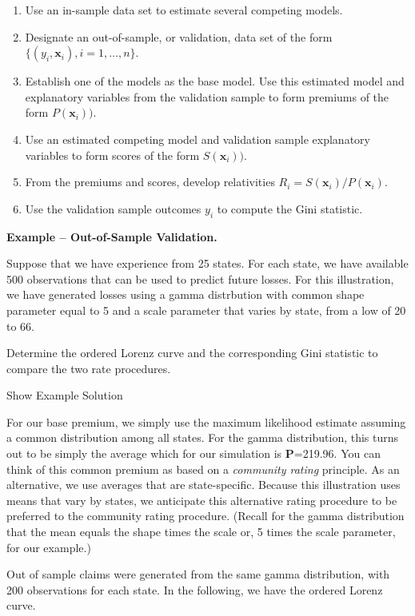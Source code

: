 \documentclass[]{book}
\providecommand{\tightlist}{%
  \setlength{\itemsep}{0pt}\setlength{\parskip}{0pt}}
\theoremstyle{definition}
\theoremstyle{definition}
\theoremstyle{definition}
\theoremstyle{remark}
\begin{document}
\begin{enumerate}
\def\labelenumi{\arabic{enumi}.}
\tightlist
\item
  Use an in-sample data set to estimate several competing models.
\item
  Designate an out-of-sample, or validation, data set of the form
  \(\{(y_i, \mathbf{x}_i), i=1,\ldots,n\}\).
\item
  Establish one of the models as the base model. Use this estimated
  model and explanatory variables from the validation sample to form
  premiums of the form \(P(\mathbf{x}_i))\).
\item
  Use an estimated competing model and validation sample explanatory
  variables to form scores of the form \(S(\mathbf{x}_i))\).
\item
  From the premiums and scores, develop relativities
  \(R_i =S(\mathbf{x}_i)/P(\mathbf{x}_i)\).
\item
  Use the validation sample outcomes \(y_i\) to compute the Gini
  statistic.
\end{enumerate}

\textbf{Example -- Out-of-Sample Validation.}

Suppose that we have experience from 25 states. For each state, we have
available 500 observations that can be used to predict future losses.
For this illustration, we have generated losses using a gamma
distrbution with common shape parameter equal to 5 and a scale parameter
that varies by state, from a low of 20 to 66.

Determine the ordered Lorenz curve and the corresponding Gini statistic
to compare the two rate procedures.

Show Example Solution

\hypertarget{toggleExampleLor}{}
For our base premium, we simply use the maximum likelihood estimate
assuming a common distribution among all states. For the gamma
distribution, this turns out to be simply the average which for our
simulation is \textbf{P}=219.96. You can think of this common premium as
based on a \emph{community rating} principle. As an alternative, we use
averages that are state-specific. Because this illustration uses means
that vary by states, we anticipate this alternative rating procedure to
be preferred to the community rating procedure. (Recall for the gamma
distribution that the mean equals the shape times the scale or, 5 times
the scale parameter, for our example.)

Out of sample claims were generated from the same gamma distribution,
with 200 observations for each state. In the following, we have the
ordered Lorenz curve.
\end{document}
